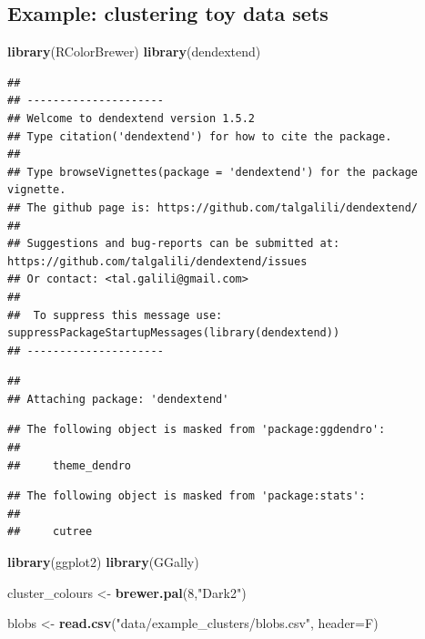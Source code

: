 \documentclass[]{book}
\newenvironment{Shaded}{\begin{snugshade}}{\end{snugshade}}
\newcommand{\KeywordTok}[1]{\textcolor[rgb]{0.13,0.29,0.53}{\textbf{{#1}}}}
\newcommand{\DataTypeTok}[1]{\textcolor[rgb]{0.13,0.29,0.53}{{#1}}}
\newcommand{\DecValTok}[1]{\textcolor[rgb]{0.00,0.00,0.81}{{#1}}}
\newcommand{\StringTok}[1]{\textcolor[rgb]{0.31,0.60,0.02}{{#1}}}
\newcommand{\NormalTok}[1]{{#1}}
\theoremstyle{definition}
\theoremstyle{definition}
\theoremstyle{definition}
\theoremstyle{remark}
\begin{document}
\subsection{Example: clustering toy data
sets}\label{example-clustering-toy-data-sets}

\begin{Shaded}
\begin{Highlighting}[]
\KeywordTok{library}\NormalTok{(RColorBrewer)}
\KeywordTok{library}\NormalTok{(dendextend)}
\end{Highlighting}
\end{Shaded}

\begin{verbatim}
## 
## ---------------------
## Welcome to dendextend version 1.5.2
## Type citation('dendextend') for how to cite the package.
## 
## Type browseVignettes(package = 'dendextend') for the package vignette.
## The github page is: https://github.com/talgalili/dendextend/
## 
## Suggestions and bug-reports can be submitted at: https://github.com/talgalili/dendextend/issues
## Or contact: <tal.galili@gmail.com>
## 
##  To suppress this message use:  suppressPackageStartupMessages(library(dendextend))
## ---------------------
\end{verbatim}

\begin{verbatim}
## 
## Attaching package: 'dendextend'
\end{verbatim}

\begin{verbatim}
## The following object is masked from 'package:ggdendro':
## 
##     theme_dendro
\end{verbatim}

\begin{verbatim}
## The following object is masked from 'package:stats':
## 
##     cutree
\end{verbatim}

\begin{Shaded}
\begin{Highlighting}[]
\KeywordTok{library}\NormalTok{(ggplot2)}
\KeywordTok{library}\NormalTok{(GGally)}

\NormalTok{cluster_colours <-}\StringTok{ }\KeywordTok{brewer.pal}\NormalTok{(}\DecValTok{8}\NormalTok{,}\StringTok{"Dark2"}\NormalTok{)}

\NormalTok{blobs <-}\StringTok{ }\KeywordTok{read.csv}\NormalTok{(}\StringTok{"data/example_clusters/blobs.csv"}\NormalTok{, }\DataTypeTok{header=}\NormalTok{F)}
\end{Highlighting}
\end{Shaded}
\end{document}
